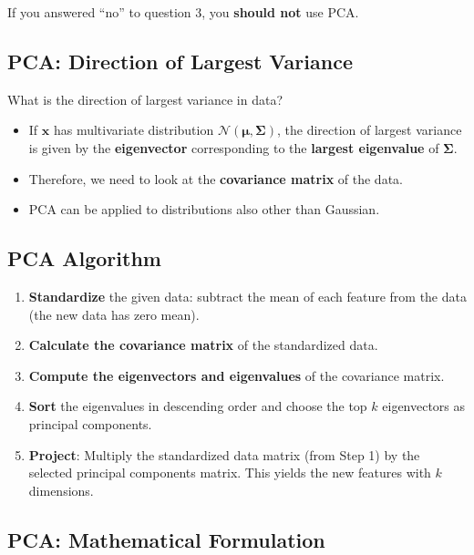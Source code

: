 \documentclass[11pt,a4paper]{article}
\theoremstyle{definition}
\theoremstyle{plain}
\theoremstyle{remark}
\begin{document}
If you answered ``no'' to question 3, you \textbf{should not} use PCA.

\subsection{PCA: Direction of Largest Variance}

What is the direction of largest variance in data?

\begin{itemize}
    \item If $\mathbf{x}$ has multivariate distribution $\mathcal{N}(\boldsymbol{\mu}, \boldsymbol{\Sigma})$, the direction of largest variance is given by the \textbf{eigenvector} corresponding to the \textbf{largest eigenvalue} of $\boldsymbol{\Sigma}$.
    \item Therefore, we need to look at the \textbf{covariance matrix} of the data.
    \item PCA can be applied to distributions also other than Gaussian.
\end{itemize}

\subsection{PCA Algorithm}

\begin{tcolorbox}[colback=cyan!5!white,colframe=cyan!75!black,title=\textbf{PCA Algorithm --- Step by Step}]
\begin{enumerate}
    \item \textbf{Standardize} the given data: subtract the mean of each feature from the data (the new data has zero mean).
    \item \textbf{Calculate the covariance matrix} of the standardized data.
    \item \textbf{Compute the eigenvectors and eigenvalues} of the covariance matrix.
    \item \textbf{Sort} the eigenvalues in descending order and choose the top $k$ eigenvectors as principal components.
    \item \textbf{Project}: Multiply the standardized data matrix (from Step 1) by the selected principal components matrix. This yields the new features with $k$ dimensions.
\end{enumerate}
\end{tcolorbox}

\subsection{PCA: Mathematical Formulation}
\end{document}
